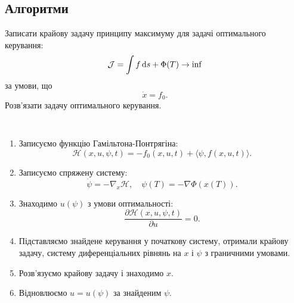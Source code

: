 \subsection{Алгоритми}

\begin{problem*}
    Записати крайову задачу принципу максимуму для задачі оптимального керування: \[ \mathcal{J} = \int f \mathop{}\!\mathrm{d} s + \Phi(T) \to \inf \] за умови, що \[ \dot x = f_0. \] Розв'язати задачу оптимального керування.
\end{problem*}

\begin{algorithm} \tt
    \begin{enumerate}
        \item Записуємо функцію Гамільтона-Понтрягіна: \[ \mathcal{H} (x, u, \psi, t) = - f_0(x, u, t) + \langle \psi, f(x, u, t) \rangle. \]
    
        \item Записуємо спряжену систему: \[ \dot \psi = - \nabla_x \mathcal{H}, \quad \psi(T) = - \nabla \Phi(x(T)). \]
    
    
        \item Знаходимо $u(\psi)$ з умови оптимальності: \[ \dfrac{\partial \mathcal{H}(x, u, \psi, t)}{\partial u} = 0. \]

        \item Підставляємо знайдене керування у початкову систему, от\-ри\-ма\-ли \allowbreak край\-о\-ву задачу, систему диференціальних рівнянь на $x$ і $\psi$ з гра\-нич\-ни\-ми  \allowbreak у\-мо\-ва\-ми.

        \item Розв'язуємо крайову задачу і знаходимо $x$.

        \item Відновлюємо $u = u (\psi)$ за знайденим $\psi$.
    \end{enumerate}
\end{algorithm}
